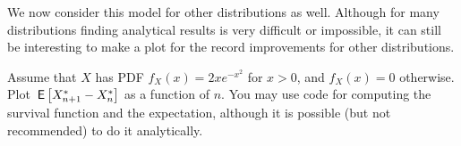 We now consider this model for other distributions as well. Although for many distributions finding analytical results is very difficult or impossible, it can still be interesting to make a plot for the record improvements for other distributions.




\begin{exercise}
Assume that $X$ has PDF $f_X(x) = 2xe^{-x^2}$ for $x>0$, and $f_X(x) = 0$ otherwise. Plot $\,\mathsf{E}\left[X_{n+1}^* - X_n^*\right]$ as a function of $n$. You may use code for computing the survival function and the expectation, although it is possible (but not recommended) to do it analytically.
\end{exercise}



